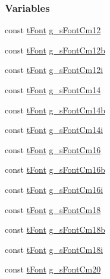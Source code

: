 \subsubsection*{Variables}
\begin{DoxyCompactItemize}
\item 
const \hyperlink{structt_font}{t\+Font} \hyperlink{group__primitives__api_ga204c1b1540d004e7081597ce9e7d672f}{g\+\_\+s\+Font\+Cm12}
\item 
const \hyperlink{structt_font}{t\+Font} \hyperlink{group__primitives__api_gafc7f3619a7537922387985a3de7a37b4}{g\+\_\+s\+Font\+Cm12b}
\item 
const \hyperlink{structt_font}{t\+Font} \hyperlink{group__primitives__api_ga25c9676f4ba16707e9df6892495a559f}{g\+\_\+s\+Font\+Cm12i}
\item 
const \hyperlink{structt_font}{t\+Font} \hyperlink{group__primitives__api_ga331a664a77d9502fcb3aba3ff71a9c06}{g\+\_\+s\+Font\+Cm14}
\item 
const \hyperlink{structt_font}{t\+Font} \hyperlink{group__primitives__api_ga6d7f4f0f93d8bff3f482dd9d3f201e19}{g\+\_\+s\+Font\+Cm14b}
\item 
const \hyperlink{structt_font}{t\+Font} \hyperlink{group__primitives__api_ga6e03e0cbb759b8b77815b67f82ae635d}{g\+\_\+s\+Font\+Cm14i}
\item 
const \hyperlink{structt_font}{t\+Font} \hyperlink{group__primitives__api_ga80b7c5d46952a73ed48afe81b12ae621}{g\+\_\+s\+Font\+Cm16}
\item 
const \hyperlink{structt_font}{t\+Font} \hyperlink{group__primitives__api_ga064bc25f9e321d35a43972b7815a35a9}{g\+\_\+s\+Font\+Cm16b}
\item 
const \hyperlink{structt_font}{t\+Font} \hyperlink{group__primitives__api_ga02db3428a351fe9d83a357fac729c2af}{g\+\_\+s\+Font\+Cm16i}
\item 
const \hyperlink{structt_font}{t\+Font} \hyperlink{group__primitives__api_gabf82ab151511968ba49c24eb3fa1589c}{g\+\_\+s\+Font\+Cm18}
\item 
const \hyperlink{structt_font}{t\+Font} \hyperlink{group__primitives__api_gae251b829e51d90426ce1d2ee49cc281c}{g\+\_\+s\+Font\+Cm18b}
\item 
const \hyperlink{structt_font}{t\+Font} \hyperlink{group__primitives__api_ga6cdec03991c4b3295d1c84f27cbd17f0}{g\+\_\+s\+Font\+Cm18i}
\item 
const \hyperlink{structt_font}{t\+Font} \hyperlink{group__primitives__api_ga8b2485a69d372b122852bf1b347d5abb}{g\+\_\+s\+Font\+Cm20}
\item 

\end{DoxyCompactItemize}
